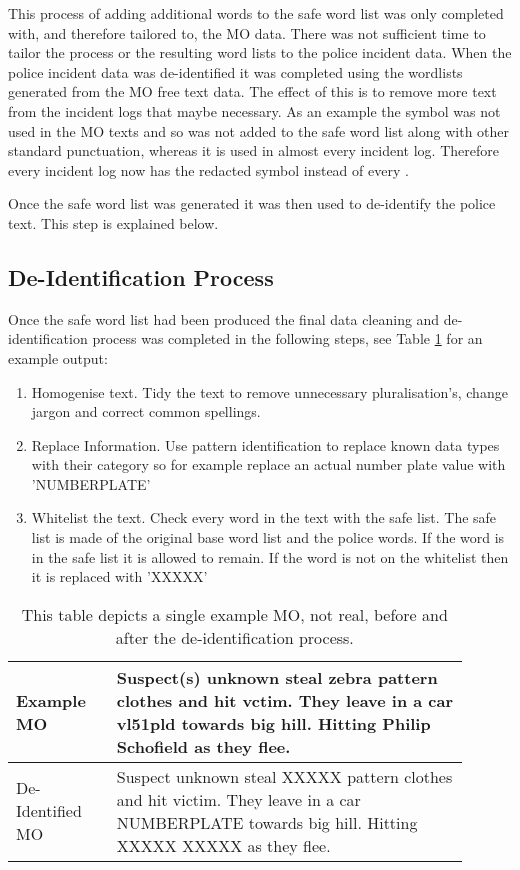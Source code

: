 This process of adding additional words to the safe word list was only completed with, and therefore tailored to, the MO data. There was not sufficient time to tailor the process or the resulting word lists to the police incident data. When the police incident data was de-identified it was completed using the wordlists generated from the MO free text data. The effect of this is to remove more text from the incident logs that maybe necessary. As an example the \say{:} symbol was not used in the MO texts and so was not added to the safe word list along with other standard punctuation, whereas it is used in almost every incident log. Therefore every incident log now has the redacted symbol  instead of every \say{:}.

Once the safe word list was generated it was then used to de-identify the police text. This step is explained below.


\subsection{De-Identification Process} Once the safe word list had been produced the final data cleaning and de-identification process was completed in the following steps, see Table \ref{Example_deident} for an example output:

\begin{enumerate}
    \item Homogenise text. Tidy the text to remove unnecessary pluralisation's, change jargon and correct common spellings.
    \item Replace Information. Use pattern identification to replace known data types with their category so for example replace an actual number plate value with 'NUMBERPLATE'
    \item Whitelist the text. Check every word in the text with the safe list. The safe list is made of the original base word list and the police words. If the word is in the safe list it is allowed to remain. If the word is not on the whitelist then it is replaced with 'XXXXX'
\end{enumerate}

\begin{table}[]
\centering
\begin{tabular}{p{0.2\linewidth}|p{0.7\linewidth}}
\toprule
Example MO       & Suspect(s) unknown steal zebra pattern clothes and hit vctim. They leave in a car vl51pld towards big hill. Hitting Philip Schofield as they flee. \\ \midrule
De-Identified MO & Suspect unknown steal XXXXX pattern clothes and hit victim. They leave in a car NUMBERPLATE towards big hill. Hitting XXXXX XXXXX as they flee.    \\ \bottomrule
\end{tabular}
\caption[Example MO de-identification process]{\label{Example_deident} This table depicts a single example MO, not real, before and after the de-identification process.}
\end{table}



